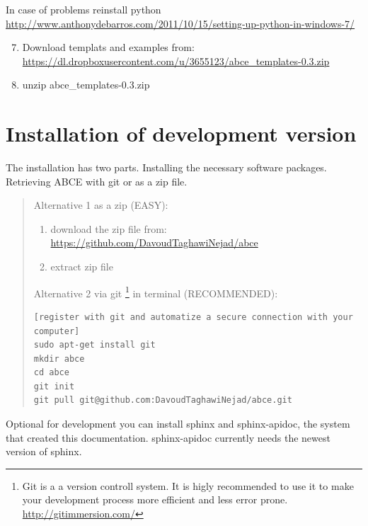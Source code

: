 \documentclass[letterpaper,10pt,english]{sphinxmanual}
\begin{document}
In case of problems reinstall python
\href{http://www.anthonydebarros.com/2011/10/15/setting-up-python-in-windows-7/}{http://www.anthonydebarros.com/2011/10/15/setting-up-python-in-windows-7/}
\begin{enumerate}
\setcounter{enumi}{6}
\item {} 
Download templats and examples from: \href{https://dl.dropboxusercontent.com/u/3655123/abce\_templates-0.3.zip}{https://dl.dropboxusercontent.com/u/3655123/abce\_templates-0.3.zip}

\item {} 
unzip abce\_templates-0.3.zip

\end{enumerate}


\section{Installation of development version}
\label{installation:installation-of-development-version}
The installation has two parts. Installing the necessary software packages. Retrieving ABCE with git or as a zip file.
\begin{quote}

Alternative 1 as a zip (EASY):
\begin{enumerate}
\item {} 
download the zip file from: \href{https://github.com/DavoudTaghawiNejad/abce}{https://github.com/DavoudTaghawiNejad/abce}

\item {} 
extract zip file

\end{enumerate}

Alternative 2 via git \footnote{
Git is a a version controll system. It is higly recommended to use it to make your development process more efficient and less error prone. \href{http://gitimmersion.com/}{http://gitimmersion.com/}
} in terminal (RECOMMENDED):

\begin{Verbatim}[commandchars=\\\{\}]
[register with git and automatize a secure connection with your computer]
sudo apt-get install git
mkdir abce
cd abce
git init
git pull git@github.com:DavoudTaghawiNejad/abce.git
\end{Verbatim}
\end{quote}

Optional for development you can install sphinx and sphinx-apidoc,
the system that created this documentation.  sphinx-apidoc
currently needs the newest version of sphinx.
\end{document}
